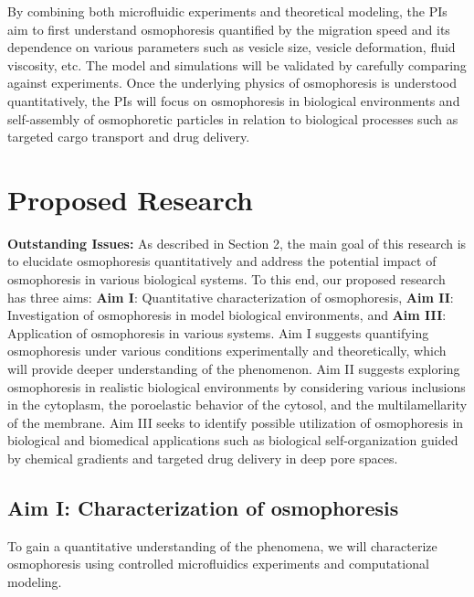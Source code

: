 \documentclass[11pt]{article}
\begin{document}
By combining both microfluidic experiments and theoretical modeling, the
PIs aim to first understand osmophoresis quantified by the migration
speed and its dependence on various parameters such as vesicle size,
vesicle deformation, fluid viscosity, etc. The model and simulations
will be validated by carefully comparing against experiments.  Once the
underlying physics of osmophoresis is understood quantitatively, the PIs
will focus on osmophoresis in biological environments and self-assembly
of osmophoretic particles in relation to biological processes such as
targeted cargo transport and drug delivery.

\section{Proposed Research\label{sec:ProposedResearch}}
\noindent
{\bf Outstanding Issues:}
%
As described in Section 2, the main goal of this research is to
elucidate osmophoresis quantitatively and address the potential impact
of osmophoresis in various biological systems. To this end, our proposed
research has three aims: {\bf Aim I}: Quantitative characterization of
osmophoresis, {\bf Aim II}: Investigation of osmophoresis in model
biological environments, and {\bf Aim III}: Application of osmophoresis
in various systems. Aim I suggests quantifying osmophoresis under
various conditions experimentally and theoretically, which will provide
deeper understanding of the phenomenon. Aim II suggests exploring
osmophoresis in realistic biological environments by considering various
inclusions in the cytoplasm, the poroelastic behavior of the cytosol,
and the multilamellarity of the membrane. Aim III seeks to identify
possible utilization of osmophoresis in biological and biomedical
applications such as biological self-organization guided by chemical
gradients and targeted drug delivery in deep pore spaces.

\subsection{Aim I: Characterization of osmophoresis}
\label{subsec:aim1}
To gain a quantitative understanding of the phenomena, we will
characterize osmophoresis using controlled microfluidics experiments and
computational modeling.

\end{document}
